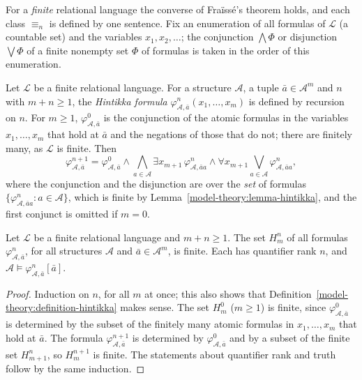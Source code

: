 For a \emph{finite} relational language the converse of Fra\"iss\'e's theorem holds, and each class $\equiv_n$ is defined by one sentence. Fix an enumeration
of all formulas of $\mathcal{L}$ (a countable set) and the variables $x_1, x_2, \ldots$; the conjunction $\bigwedge\Phi$ or disjunction $\bigvee\Phi$ of a finite
nonempty set $\Phi$ of formulas is taken in the order of this enumeration.

\begin{definition}\label{model-theory:definition-hintikka}
Let $\mathcal{L}$ be a finite relational language. For a structure $\mathcal{A}$, a tuple $\bar{a} \in \mathcal{A}^m$ and $n$ with $m + n \geq 1$, the
\emph{Hintikka formula} $\varphi^n_{\mathcal{A}, \bar{a}}(x_1, \ldots, x_m)$ is defined by recursion on $n$. For $m \geq 1$, $\varphi^0_{\mathcal{A}, \bar{a}}$ is
the conjunction of the atomic formulas in the variables $x_1, \ldots, x_m$ that hold at $\bar{a}$ and the negations of those that do not; there are finitely
many, as $\mathcal{L}$ is finite. Then
\[
\varphi^{n+1}_{\mathcal{A}, \bar{a}} = \varphi^0_{\mathcal{A}, \bar{a}} \wedge \bigwedge_{a \in \mathcal{A}}\exists x_{m+1}\,\varphi^n_{\mathcal{A}, \bar{a}a}
\wedge \forall x_{m+1}\bigvee_{a \in \mathcal{A}}\varphi^n_{\mathcal{A}, \bar{a}a},
\]
where the conjunction and the disjunction are over the \emph{set} of formulas $\{\varphi^n_{\mathcal{A}, \bar{a}a} : a \in \mathcal{A}\}$, which is finite by
Lemma~\ref{model-theory:lemma-hintikka}, and the first conjunct is omitted if $m = 0$.
\end{definition}

\begin{lemma}\label{model-theory:lemma-hintikka}
Let $\mathcal{L}$ be a finite relational language and $m + n \geq 1$. The set $H^n_m$ of all formulas $\varphi^n_{\mathcal{A}, \bar{a}}$, for all structures
$\mathcal{A}$ and $\bar{a} \in \mathcal{A}^m$, is finite. Each has quantifier rank $n$, and $\mathcal{A} \models \varphi^n_{\mathcal{A}, \bar{a}}[\bar{a}]$.
\end{lemma}

\begin{proof}
Induction on $n$, for all $m$ at once; this also shows that Definition~\ref{model-theory:definition-hintikka} makes sense. The set $H^0_m$ ($m \geq 1$) is finite,
since $\varphi^0_{\mathcal{A}, \bar{a}}$ is determined by the subset of the finitely many atomic formulas in $x_1, \ldots, x_m$ that hold at $\bar{a}$. The
formula $\varphi^{n+1}_{\mathcal{A}, \bar{a}}$ is determined by $\varphi^0_{\mathcal{A}, \bar{a}}$ and by a subset of the finite set $H^n_{m+1}$, so $H^{n+1}_m$ is
finite. The statements about quantifier rank and truth follow by the same induction.
\end{proof}

